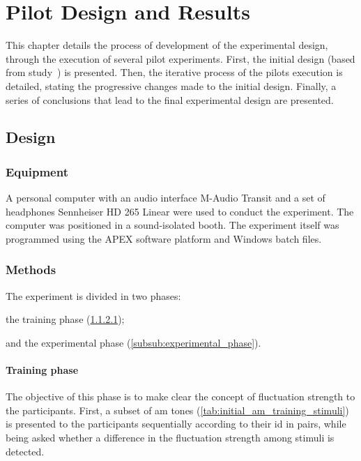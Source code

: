 \documentclass[../main.tex]{subfiles}
\begin{document}
\chapter{Pilot Design and Results}

This chapter details the process of development of the experimental design,
through the execution of several pilot experiments. First, the initial design
(based from \citeauthor{Fastl1982Fluctuation} study~\cite{Fastl1982Fluctuation})
is presented. Then, the iterative process of the pilots execution is detailed,
stating the progressive changes made to the initial design. Finally, a series of
conclusions that lead to the final experimental design are presented.

\section{Design}

\subsection{Equipment}
\label{subsec:pilot_equipment}

A personal computer with an audio interface M-Audio Transit and a set of
headphones Sennheiser HD 265 Linear were used to conduct the experiment. The
computer was positioned in a sound-isolated booth. The experiment itself was
programmed using the APEX software platform and Windows batch files.

\subsection{Methods}

The experiment is divided in two phases:
\begin{inparaenum}[(1)]
  \item the training phase (\ref{subsub:training_phase});
  \item and the experimental phase (\ref{subsub:experimental_phase}).
\end{inparaenum}

\subsubsection{Training phase}
\label{subsub:training_phase}

The objective of this phase is to make clear the concept of fluctuation strength
to the participants. First, a subset of \gls{am} tones
(\cref{tab:initial_am_training_stimuli}) is presented to the participants
sequentially according to their id in pairs, while being asked whether a
difference in the fluctuation strength among stimuli is detected.
\end{document}
